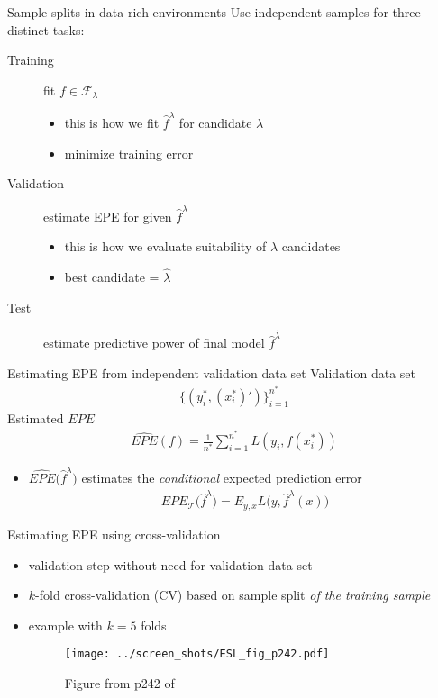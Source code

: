 \documentclass[xcolor=dvipsnames, handout]{beamer}
\begin{document}
\begin{frame}{Sample-splits in data-rich environments}
Use independent samples for three distinct tasks: 
\begin{description}
\item[Training] fit $f \in \mathcal{F}_{\lambda}$
\begin{itemize}
  \item this is how we fit $\hat{f}^{\lambda}$ for candidate $\lambda$
  \item minimize training error
\end{itemize}
\item[Validation] estimate EPE for given $\hat{f}^{\lambda}$
\begin{itemize}
  \item this is how we evaluate suitability of $\lambda$ candidates
  \item best candidate = $\hat{\lambda}$
\end{itemize}
\item[Test] estimate predictive power of final model $\hat{f}^{\hat{\lambda}}$
\end{description}
\end{frame}

\begin{frame}{Estimating EPE from independent validation data set}
Validation data set 
\begin{align*}
  \{(y^*_i, (x_i^*)')\}_{i=1}^{n^*}
\end{align*}
\pause 
Estimated $EPE$
\begin{align*}
  \widehat{EPE}\left(f\right) = \frac{1}{n^*} \sum_{i=1}^{n^*} L\left(y_i, f(x^*_i)\right)   
\end{align*}
\pause 
\begin{itemize}
  \item $\widehat{EPE}\big(\hat{f}^{\lambda}\big)$ estimates the \emph{conditional} expected prediction error
  \begin{align*}
    EPE_{\mathcal{T}} \big(\hat{f}^{\lambda}\big) = E_{y, x} L \big(y, \hat{f}^{\lambda}(x) \big)
  \end{align*}
\end{itemize}
\end{frame}


\begin{frame}{Estimating EPE using cross-validation}
\begin{itemize}
  \item validation step without need for validation data set
  \pause
  \item $k$-fold cross-validation (CV) based on sample split \emph{of the training sample}
  \pause 
  \item example with $k=5$ folds
  \begin{figure}
  \texttt{[image: ../screen\_shots/ESL\_fig\_p242.pdf]}
   \caption{Figure from p242 of \textcite{hastie2009elements}}
\end{figure}
\end{itemize}
\end{frame}
\end{document}
